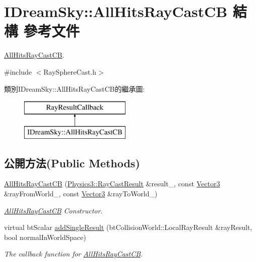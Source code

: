 \hypertarget{struct_i_dream_sky_1_1_all_hits_ray_cast_c_b}{}\section{I\+Dream\+Sky\+:\+:All\+Hits\+Ray\+Cast\+CB 結構 參考文件}
\label{struct_i_dream_sky_1_1_all_hits_ray_cast_c_b}


\hyperlink{struct_i_dream_sky_1_1_all_hits_ray_cast_c_b}{All\+Hits\+Ray\+Cast\+CB}.  




{\ttfamily \#include $<$Ray\+Sphere\+Cast.\+h$>$}

類別\+I\+Dream\+Sky\+:\+:All\+Hits\+Ray\+Cast\+C\+B的繼承圖\+:\begin{figure}[H]
\begin{center}
\leavevmode
\includegraphics[height=2.000000cm]{struct_i_dream_sky_1_1_all_hits_ray_cast_c_b}
\end{center}
\end{figure}
\subsection*{公開方法(Public Methods)}
\begin{DoxyCompactItemize}
\item 
\hyperlink{struct_i_dream_sky_1_1_all_hits_ray_cast_c_b_a445f547b2ddd073ca775e6d115aa86b0}{All\+Hits\+Ray\+Cast\+CB} (\hyperlink{class_i_dream_sky_1_1_physics3_1_1_ray_cast_result}{Physics3\+::\+Ray\+Cast\+Result} \&result\+\_\+, const \hyperlink{class_i_dream_sky_1_1_vector3}{Vector3} \&ray\+From\+World\+\_\+, const \hyperlink{class_i_dream_sky_1_1_vector3}{Vector3} \&ray\+To\+World\+\_\+)
\begin{DoxyCompactList}\small\item\em \hyperlink{struct_i_dream_sky_1_1_all_hits_ray_cast_c_b}{All\+Hits\+Ray\+Cast\+CB} Constructor. \end{DoxyCompactList}\item 
virtual bt\+Scalar \hyperlink{struct_i_dream_sky_1_1_all_hits_ray_cast_c_b_a23b9e5b4221d0d4a2582d99e19e9ad49}{add\+Single\+Result} (bt\+Collision\+World\+::\+Local\+Ray\+Result \&ray\+Result, bool normal\+In\+World\+Space)
\begin{DoxyCompactList}\small\item\em The callback function for \hyperlink{struct_i_dream_sky_1_1_all_hits_ray_cast_c_b}{All\+Hits\+Ray\+Cast\+CB}. \end{DoxyCompactList}\end{DoxyCompactItemize}
